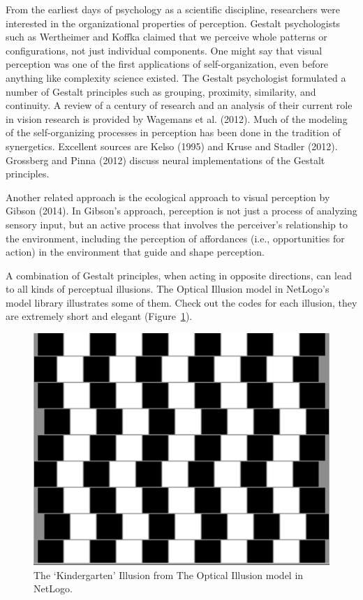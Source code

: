 \documentclass[
  a4paper,
  DIV=11,
  numbers=noendperiod,
  oneside]{scrreprt}
\begin{document}
From the earliest days of psychology as a scientific discipline,
researchers were interested in the organizational properties of
perception. Gestalt psychologists such as Wertheimer and Koffka claimed
that we perceive whole patterns or configurations, not just individual
components. One might say that visual perception was one of the first
applications of self-organization, even before anything like complexity
science existed. The Gestalt psychologist formulated a number of Gestalt
principles such as grouping, proximity, similarity, and continuity. A
review of a century of research and an analysis of their current role in
vision research is provided by Wagemans et al. (2012). Much of the
modeling of the self-organizing processes in perception has been done in
the tradition of synergetics. Excellent sources are Kelso (1995) and
Kruse and Stadler (2012). Grossberg and Pinna (2012) discuss neural
implementations of the Gestalt principles.

Another related approach is the ecological approach to visual perception
by Gibson (2014). In Gibson's approach, perception is not just a process
of analyzing sensory input, but an active process that involves the
perceiver's relationship to the environment, including the perception of
affordances (i.e., opportunities for action) in the environment that
guide and shape perception.

A combination of Gestalt principles, when acting in opposite directions,
can lead to all kinds of perceptual illusions. The Optical Illusion
model in NetLogo's model library illustrates some of them. Check out the
codes for each illusion, they are extremely short and elegant
(Figure~\ref{fig-ch5n-img6-old-44}).

\begin{figure}

{\centering \includegraphics{media/ch5n/image6.jpg}

}

\caption{\label{fig-ch5n-img6-old-44}The `Kindergarten' Illusion from
The Optical Illusion model in NetLogo.}

\end{figure}
\end{document}

